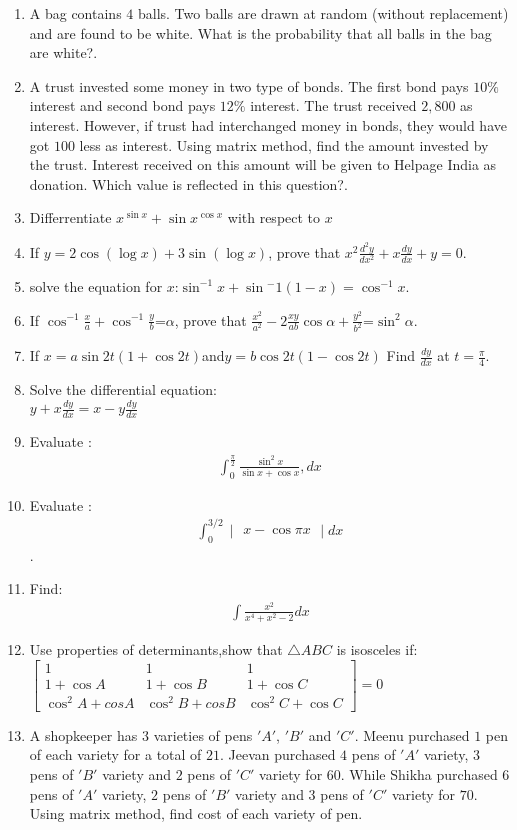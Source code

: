 \documentclass[12pt,-letter paper]{article}
\providecommand{\mydet}[1]{\ensuremath{\begin{vmatrix}#1\end{vmatrix}}}
\providecommand{\myvec}[1]{\ensuremath{\begin{bmatrix}#1\end{bmatrix}}}
\providecommand{\brak}[1]{\ensuremath{\left(#1\right)}}
\begin{document}
\begin{enumerate}
\item  A bag contains $4$ balls. Two balls are drawn at random (without replacement) and are found to be white.  What is the probability that all balls in the bag are white?.
\item A trust invested some money in two type of bonds. The first bond pays $10\%$ interest and second bond pays $12\%$ interest.  The trust received \rupee$2,800$ as interest. However, if trust had interchanged money in bonds, they would have got \rupee$100$ less as interest. Using matrix method, find the amount invested by the trust. Interest received on this amount will be given to Helpage India as donation. Which value is reflected in this question?.
\item Differrentiate $x^{\sin x}+\sin x^{\cos x}$ with respect to $x$
\item If $ y=2\cos\brak{\log x}+3\sin\brak{\log x}$, prove that $x^2\frac{d^2y}{dx^2}+x\frac{dy}{dx}+y=0$.
\item solve the equation for $x$:$\sin^{-1}x+\sin{^-1}(1-x) = \cos^{-1}x$.
\item If $\cos^{-1}\frac{x}{a}+\cos^{-1}\frac{y}{b}$=$\alpha$, prove that $\frac{x^2}{a^2}-2\frac{xy}{ab}\cos\alpha+\frac{y^2}{b^2}$=$\sin^2\alpha$.
\item If  $x= a \sin 2t \brak{1 + \cos 2t}$and$y= b \cos 2t\brak{1 - \cos 2t}$
Find $\frac{dy}{dx}$ at $ t = \frac{\pi}{4}$.
\item Solve the differential equation:\\ $ y + x \frac{dy}{dx} = x - y \frac{dy}{dx}$
\item Evaluate : \begin{align*} \int_{0}^{\frac{\pi}{2}} \frac{\sin^2 x}{\sin x + \cos x}, dx \end{align*}
\item Evaluate : \begin{align*} \int_{0}^{3/2}\mydet{x-\cos \pi x}dx \end{align*} .	
	\item Find:\begin{align*} \int \frac{x^2}{x^4+x^2-2}dx\end{align*}
\item Use properties of determinants,show that $\triangle{ABC}$ is isosceles if:\\
$\myvec{1 & 1 & 1 \\ 1+\cos A & 1+\cos B & 1+\cos C \\ \cos^2A+cosA & \cos^2B+cosB & \cos^2C+\cos C}=0$
\item A shopkeeper has $3$ varieties of pens $'A'$, $'B'$ and $'C'$. Meenu purchased $1$ pen of each variety for a total of \rupee$21$. Jeevan purchased $4$ pens of $'A'$ variety, $3$ pens of $'B'$ variety and $2$ pens of $'C'$ variety for \rupee$60$. While Shikha purchased $6$ pens of $'A'$ variety, $2$ pens of $'B'$ variety and $3$ pens of $'C'$ variety for \rupee$70$. Using matrix method, find cost of each variety of pen.

\end{enumerate}
\end{document}
